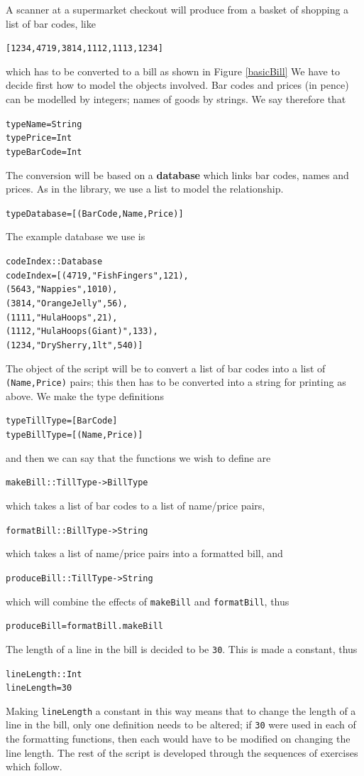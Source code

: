 A scanner at a supermarket checkout will produce from a basket
of shopping a list of bar codes,
like
\begin{alltt}
[1234,4719,3814,1112,1113,1234]
\end{alltt}
which has to be converted to a bill as shown in Figure \ref{basicBill}
We have to decide first how to model the objects involved. Bar codes and
prices (in pence) can be modelled by integers; names of goods by strings. We
say therefore that
\begin{alltt}
type Name    = String
type Price   = Int
type BarCode = Int
\end{alltt}
The conversion will be based on a \textbf{database}
which links bar
codes, names and prices. As in the library, we use a list to model the
relationship. 
\begin{alltt}
type Database = [ (BarCode,Name,Price) ]
\end{alltt}
The example database we use is
\begin{alltt}
codeIndex :: Database
codeIndex = [ (4719, "Fish Fingers" , 121),
              (5643, "Nappies" , 1010),
              (3814, "Orange Jelly", 56),
              (1111, "Hula Hoops", 21),
              (1112, "Hula Hoops (Giant)", 133),
              (1234, "Dry Sherry, 1lt", 540)]
\end{alltt}
The object of the script will be to convert a list of bar codes into a list
of \texttt{(Name,Price)} pairs; this then has to be converted into a string
for printing as above. We make the type definitions
\begin{alltt}
type TillType = [BarCode]
type BillType = [(Name,Price)]
\end{alltt} 
and then we can say that the functions we wish to define are 
\begin{alltt}
makeBill    :: TillType -> BillType
\end{alltt}
which takes a list of bar codes to a list of name/price pairs,
\begin{alltt}
formatBill  :: BillType -> String
\end{alltt}
which takes a list of name/price pairs into a formatted bill, and
\begin{alltt}
produceBill :: TillType -> String
\end{alltt}
which will combine the effects of \texttt{makeBill} and
\texttt{formatBill}, thus
\begin{alltt}
produceBill = formatBill . makeBill
\end{alltt}
The length of a line in the bill is decided to be \texttt{30}. This is made a
constant, thus
\begin{alltt}
lineLength :: Int
lineLength = 30
\end{alltt}
Making \texttt{lineLength} a constant in this way means that to change the
length of a line in the bill, only one definition needs to be altered; if
\texttt{30} were used in each of the formatting functions, then each would have
to be modified on changing the line length. 
The rest of the script is developed through the sequences of
exercises which follow. 


